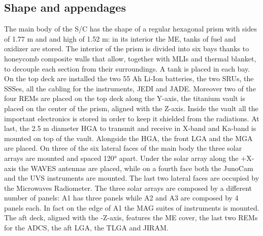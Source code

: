 \subsection{Shape and appendages}
\label{subsec:shape_appendages}


The main body of the S/C has the shape of a regular hexagonal prism with sides of 1.77 m and and high of 1.52 m: in its interior the ME, tanks of fuel and oxidizer are stored. The interior of the prism is divided into six bays thanks to honeycomb composite walls that allow, together with MLIs and thermal blanket, to decouple each section from their surroundings. A tank is placed in each bay. On the top deck are installed the two 55 Ah Li-Ion batteries, the two SRUs, the SSSes, all the cabling for the instruments, JEDI and JADE. Moreover two of the four REMs are placed on the top deck along the Y-axis, the titanium vault is placed on the center of the prism, aligned with the Z-axis. Inside the vault all the important electronics is stored in order to keep it shielded from the radiations. At last, the 2.5 m diameter HGA to transmit and receive in X-band and Ka-band is mounted on top of the vault. Alongside the HGA, the front LGA and the MGA are placed. On three of the six lateral faces of the main body the three solar arrays are mounted and spaced 120° apart. Under the solar array along the +X-axis the WAVES antennas are placed, while on a fourth face both the JunoCam and the UVS instruments are mounted. The last two lateral faces are occupied by the Microwaves Radiometer. The three solar arrays are composed by a different number of panels: A1 has three panels while A2 and A3 are composed by 4 panels each. In fact on the edge of A1 the MAG suites of instruments is mounted. The aft deck, aligned with the -Z-axis, features the ME cover, the last two REMs for the ADCS, the aft LGA, the TLGA and JIRAM.
